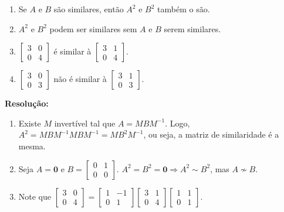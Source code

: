 \documentclass[leqno]{article}
\begin{document}
\begin{enumerate}
    \begin{enumerate}
        \item Se $A$ e $B$ são similares, então $A^2$ e $B^2$ também o são.
        \item $A^2$ e $B^2$ podem ser similares sem $A$ e $B$ serem similares.
        \item $\begin{bmatrix}3 & 0\\
        0 & 4\end{bmatrix}$ é similar à $\begin{bmatrix}3 & 1\\
        0 & 4\end{bmatrix}$.
        \item $\begin{bmatrix}3 & 0\\
        0 & 3\end{bmatrix}$ não é similar à $\begin{bmatrix}3 & 1\\
        0 & 3\end{bmatrix}$.
    \end{enumerate}
    
    \textbf{Resolução:}
    
    \begin{enumerate}
        \item Existe $M$ invertível tal que $A=MBM^{-1}$. Logo, $A^2=MBM^{-1}MBM^{-1}=MB^2M^{-1}$, ou seja, a matriz de similaridade é a mesma.
        
        \item Seja $A=\textbf{0}$ e $B=\begin{bmatrix}0 & 1\\
        0 & 0\end{bmatrix}$. $A^2=B^2=\textbf{0}\Rightarrow A^2\sim B^2$, mas $A\not\sim B$.
        
        \item Note que $\begin{bmatrix}3 & 0\\
        0 & 4\end{bmatrix}=\begin{bmatrix}1 & -1\\
        0 & 1\end{bmatrix}\begin{bmatrix}3 & 1\\
        0 & 4\end{bmatrix}\begin{bmatrix}1 & 1\\
        0 & 1\end{bmatrix}$.
        

\end{enumerate}
\end{enumerate}
\end{document}
